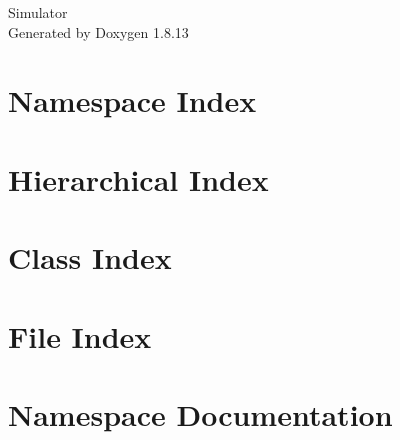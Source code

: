 \documentclass[twoside]{book}
\newcommand{\+}{\discretionary{\mbox{\scriptsize$\hookleftarrow$}}{}{}}
\newcommand{\clearemptydoublepage}{%
  \newpage{\pagestyle{empty}\cleardoublepage}%
}
\begin{document}
\hypersetup{pageanchor=false,
             bookmarksnumbered=true,
             pdfencoding=unicode
            }
\begin{titlepage}
\vspace*{7cm}
\begin{center}%
{\Large Simulator }\\
\vspace*{1cm}
{\large Generated by Doxygen 1.8.13}\\
\end{center}
\end{titlepage}
\clearemptydoublepage
{}
\tableofcontents
\clearemptydoublepage
{}
\hypersetup{pageanchor=true}

\chapter{Namespace Index}

\chapter{Hierarchical Index}

\chapter{Class Index}

\chapter{File Index}

\chapter{Namespace Documentation}

\end{document}
